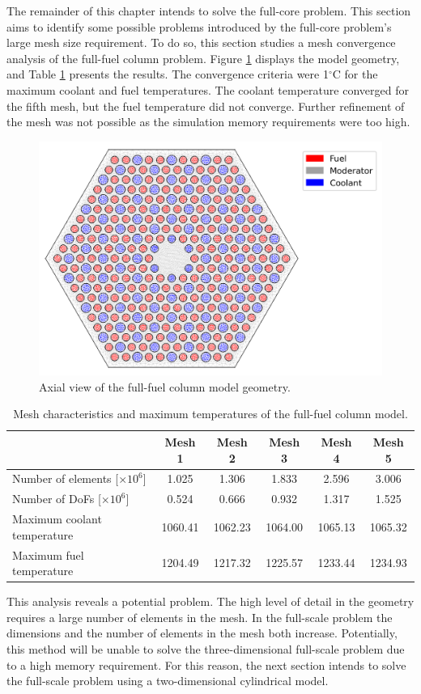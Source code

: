 The remainder of this chapter intends to solve the full-core problem.
This section aims to identify some possible problems introduced by the full-core problem's large mesh size requirement.
To do so, this section studies a mesh convergence analysis of the full-fuel column problem.
Figure \ref{fig:th-full-assem-mesh} displays the model geometry, and Table \ref{tab:th-full-assem-results} presents the results.
The convergence criteria were 1$^{\circ}$C for the maximum coolant and fuel temperatures.
The coolant temperature converged for the fifth mesh, but the fuel temperature did not converge.
Further refinement of the mesh was not possible as the simulation memory requirements were too high.

\begin{figure}[htbp!]
  \centering
  \includegraphics[width=0.45\linewidth]{figures-thermal/full-assem-mesh2}
  \hfill
  \caption{Axial view of the full-fuel column model geometry.}
  \label{fig:th-full-assem-mesh}
\end{figure}

\begin{table}[htbp!]
  \centering
  \caption{Mesh characteristics and maximum temperatures of the full-fuel column model.}
  \label{tab:th-full-assem-results}
\begin{tabular}{lccccc}
\toprule
                            & Mesh 1 & Mesh 2 & Mesh 3 & Mesh 4 & Mesh 5 \\
\midrule
Number of elements [$\times 10^{6}$]  & 1.025 & 1.306 & 1.833 & 2.596 & 3.006 \\
Number of DoFs [$\times 10^{6}$]      & 0.524 & 0.666 & 0.932 & 1.317 & 1.525 \\
Maximum coolant temperature & 1060.41 & 1062.23 & 1064.00 & 1065.13 & 1065.32 \\
Maximum fuel temperature    & 1204.49 & 1217.32 & 1225.57 & 1233.44 & 1234.93 \\
\bottomrule
\end{tabular}
\end{table}

This analysis reveals a potential problem.
The high level of detail in the geometry requires a large number of elements in the mesh.
In the full-scale problem the dimensions and the number of elements in the mesh both increase.
Potentially, this method will be unable to solve the three-dimensional full-scale problem due to a high memory requirement.
For this reason, the next section intends to solve the full-scale problem using a two-dimensional cylindrical model.

